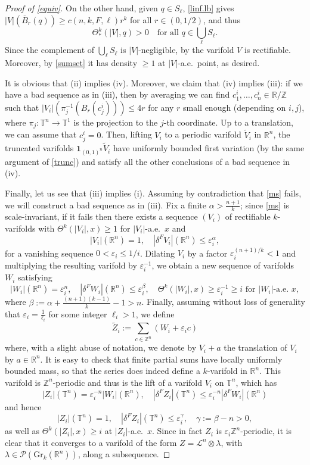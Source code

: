 \documentclass[11pt,a4paper]{amsart}
\newcommand{\Z}{\mathbb{Z}}
\newcommand{\R}{\mathbb{R}}
\newcommand{\uno}{\bm{1}}
\renewcommand{\bar}{\overline}
\theoremstyle{definition}
\renewcommand{\epsilon}{\varepsilon}
\newcommand{\gr}{\text{Gr}_k(\R^n)}
\begin{document}
\begin{proof}[Proof of \cref{equiv}]
    On the other hand, given $q\in S_\ell$, \cref{linf.lb} gives $|V|(\bar B_r(q))\ge c(n,k,F,\ell)r^k$ for all $r\in(0,1/2)$, and thus
    $$\Theta^k_*(|V|,q)>0\quad\text{for all }q\in\bigcup_\ell S_\ell.$$
    Since the complement of $\bigcup_\ell S_\ell$ is $|V|$-negligible, by \cite[Theorem 1.2]{DDG}
    the varifold $V$ is rectifiable. Moreover, by \cref{sumset} it has density $\ge1$ at $|V|$-a.e.\ point, as desired.

    It is obvious that (ii) implies (iv). Moreover, we claim that (iv) implies (iii):
    if we have a bad sequence as in (iii), then by averaging we can find $c_1^i,\dots,c_n^i\in\R/\Z$
    such that $|V_i|(\pi_j^{-1}(B_r(c_j^i)))\le 4r$ for any $r$ small enough (depending on $i,j$),
    where $\pi_j:\mathbb{T}^n\to\mathbb{T}^1$ is the projection to the $j$-th coordinate.
    Up to a translation, we can assume that $c^i_j=0$. Then, lifting $V_i$ to a periodic varifold $\tilde V_i$
    in $\R^n$, the truncated varifolds $\uno_{(0,1)^n}\tilde V_i$ have uniformly bounded first variation
    (by the same argument of \cref{trunc}) and satisfy all the other conclusions of a bad sequence in (iv).

    Finally, let us see that (iii) implies (i). Assuming by contradiction that \cref{ms} fails,
    we will construct a bad sequence as in (iii). Fix a finite $\alpha>\frac{n+1}{k}$; since \cref{ms} is scale-invariant, if it fails then
    there exists a sequence $(V_i)$ of rectifiable $k$-varifolds with $\Theta^k(|V_i|,x)\ge1$ for $|V_i|$-a.e.\ $x$ and
    $$|V_i|(\R^n)=1,\quad |\delta^FV_i|(\R^n)\le\epsilon_i^\alpha,$$
    for a vanishing sequence $0<\epsilon_i\le1/i$.
    Dilating $V_i$ by a factor $\epsilon_i^{(n+1)/k}<1$ and multiplying the resulting varifold by $\epsilon_i^{-1}$,
    we obtain a new sequence of varifolds $W_i$ satisfying
    $$|W_i|(\R^n)=\epsilon_i^n,\quad|\delta^FW_i|(\R^n)\le\epsilon_i^\beta,\quad\Theta^k(|W_i|,x)\ge\epsilon_i^{-1}\ge i\text{ for $|W_i|$-a.e.\ $x$},$$
    where $\beta:=\alpha+\frac{(n+1)(k-1)}{k}-1>n$.
    Finally, assuming without loss of generality that $\epsilon_i=\frac{1}{\ell_i}$ for some integer $\ell_i>1$, we define
    $$\tilde Z_i:=\sum_{c\in\Z^n}(W_i+\epsilon_ic)$$
    where, with a slight abuse of notation, we denote by $V_i+a$ the translation of $V_i$ by $a\in\R^n$.
    It is easy to check that finite partial sums have locally uniformly bounded mass, so that the series does indeed define a $k$-varifold in $\R^n$.
    This varifold is $\Z^n$-periodic and thus is the lift of a varifold $V_i$ on $\mathbb{T}^n$, which has
    $$|Z_i|(\mathbb{T}^n)=\epsilon_i^{-n}|W_i|(\R^n),\quad|\delta^F Z_i|(\mathbb{T}^n)\le\epsilon_i^{-n}|\delta^F W_i|(\R^n)$$
    and hence
    $$|Z_i|(\mathbb{T}^n)=1,\quad|\delta^F Z_i|(\mathbb{T}^n)\le\epsilon_i^{\gamma},\quad\gamma:=\beta-n>0,$$
    as well as $\Theta^k(|Z_i|,x)\ge i$ at $|Z_i|$-a.e.\ $x$.
    Since in fact $Z_i$ is $\epsilon_i\Z^n$-periodic, it is clear that it converges to a varifold of the form
    $Z=\mathcal{L}^n\otimes\lambda$, with $\lambda\in\mathcal{P}(\gr)$, along a subsequence.
\end{proof}
\end{document}
